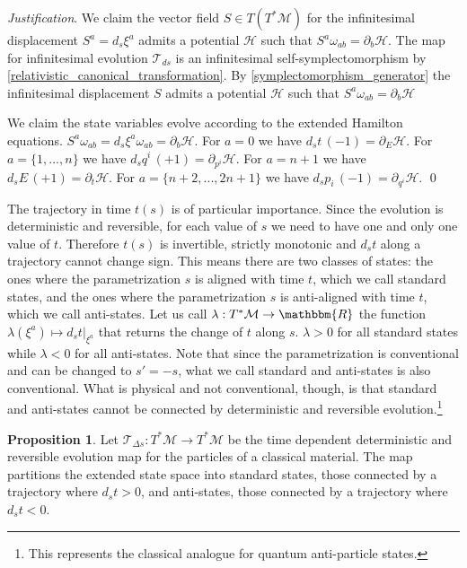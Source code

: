 \documentclass[aps,pra,10pt,twocolumn,floatfix,nofootinbib]{revtex4-1}
\numberwithin{equation}{section}
\theoremstyle{definition}
\newtheorem{prop}[equation]{Proposition}
\newenvironment{justification}{\emph{Justification}.}{\qed}
\begin{document}
\begin{justification}
We claim the vector field $S \in T(T^*\mathcal{M})$ for the infinitesimal displacement $S^a = d_s\xi^a$ admits a potential $\mathcal{H}$ such that $S^{a} \omega_{ab} = \partial_{b}\mathcal{H}$. The map for infinitesimal evolution $\mathcal{T}_{ds}$ is an infinitesimal self-symplectomorphism by \ref{relativistic_canonical_transformation}. By \ref{symplectomorphism_generator} the infinitesimal displacement $S$ admits a potential $\mathcal{H}$ such that $S^{a} \omega_{ab} = \partial_{b}\mathcal{H}$

We claim the state variables evolve according to the extended Hamilton equations. $S^{a} \omega_{ab} = d_s\xi^a \omega_{ab} = \partial_{b}\mathcal{H}$. For $a = 0$ we have $d_s t \, (-1) = \partial_{E} \mathcal{H}$. For  $a=\{1,...,n\}$ we have $d_s q^i \, (+1) = \partial_{p^i} \mathcal{H}$. For $a=n+1$ we have $d_s E \, (+1) = \partial_{t} \mathcal{H}$. For $a=\{n+2,...,2n + 1\}$ we have $d_s p_i \, (-1) = \partial_{q^i} \mathcal{H}$.
\end{justification}

The trajectory in time $t(s)$ is of particular importance. Since the evolution is deterministic and reversible, for each value of $s$ we need to have one and only one value of $t$. Therefore $t(s)$ is invertible, strictly monotonic and $d_{s}t$ along a trajectory cannot change sign. This means there are two classes of states: the ones where the parametrization $s$ is aligned with time $t$, which we call standard states, and the ones where the parametrization $s$ is anti-aligned with time $t$, which we call anti-states. Let us call $\lambda : T^*\mathcal{M} \rightarrow \mathbbm{R}$ the function $\lambda (\xi^a) \mapsto d_s t |_{\xi^a}$ that returns the change of $t$ along $s$. $\lambda > 0$ for all standard states while $\lambda < 0$ for all anti-states.  Note that since the parametrization is conventional and can be changed to $s'=-s$, what we call standard and anti-states is also conventional. What is physical and not conventional, though, is that standard and anti-states cannot be connected by deterministic and reversible evolution.\footnote{This represents the classical analogue for quantum anti-particle states.}

\begin{prop}\label{prop:antistates}
	Let $\mathcal{T}_{\Delta s}: T^*\mathcal{M} \rightarrow T^*\mathcal{M}$ be the time dependent deterministic and reversible evolution map for the particles of a classical material. The map partitions the extended state space into standard states, those connected by a trajectory where $d_{s}t>0$, and anti-states, those connected by a trajectory where $d_{s}t<0$.
\end{prop}
\end{document}
